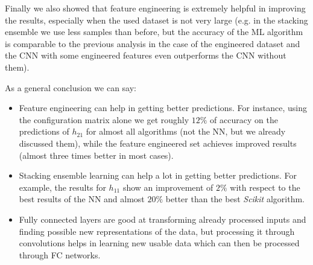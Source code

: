Finally we also showed that feature engineering is extremely helpful in improving the results, especially when the used dataset is not very large (e.g. in the stacking ensemble we use less samples than before, but the accuracy of the ML algorithm is comparable to the previous analysis in the case of the engineered dataset and the CNN with some engineered features even outperforms the CNN without them).

As a general conclusion we can say:
\begin{itemize}
    \item Feature engineering can help in getting better predictions. For instance, using the configuration matrix alone we get roughly $12\%$ of accuracy on the predictions of $h_{21}$ for almost all algorithms (not the NN, but we already discussed them), while the feature engineered set achieves improved results (almost three times better in most cases).
    \item Stacking ensemble learning can help a lot in getting better predictions. For example, the results for $h_{11}$ show an improvement  of $2\%$ with respect to the best results of the NN and almost $20\%$ better than the best \textit{Scikit} algorithm.
    \item Fully connected layers are good at transforming already processed inputs and finding possible new representations of the data, but processing it through convolutions helps in learning new usable data which can then be processed through FC networks.
\end{itemize}